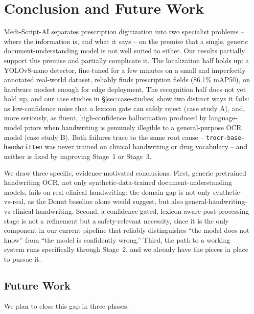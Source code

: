 \documentclass[conference]{IEEEtran}
\begin{document}
\section{Conclusion and Future Work}
\label{sec:conclusion}

Medi-Script-AI separates prescription digitization into two specialist problems -- where the information is, and what it says -- on the premise that a single, generic document-understanding model is not well suited to either. Our results partially support this premise and partially complicate it. The localization half holds up: a YOLOv8-nano detector, fine-tuned for a few minutes on a small and imperfectly annotated real-world dataset, reliably finds prescription fields (86.1\% mAP50), on hardware modest enough for edge deployment. The recognition half does not yet hold up, and our case studies in \S\ref{sec:case-studies} show two distinct ways it fails: as low-confidence noise that a lexicon gate can safely reject (case study A), and, more seriously, as fluent, high-confidence hallucination produced by language-model priors when handwriting is genuinely illegible to a general-purpose OCR model (case study B). Both failures trace to the same root cause -- \texttt{trocr-base-handwritten} was never trained on clinical handwriting or drug vocabulary -- and neither is fixed by improving Stage~1 or Stage~3.

We draw three specific, evidence-motivated conclusions. First, generic pretrained handwriting OCR, not only synthetic-data-trained document-understanding models, fails on real clinical handwriting: the domain gap is not only synthetic-vs-real, as the Donut baseline alone would suggest, but also general-handwriting-vs-clinical-handwriting. Second, a confidence-gated, lexicon-aware post-processing stage is not a refinement but a safety-relevant necessity, since it is the only component in our current pipeline that reliably distinguishes ``the model does not know'' from ``the model is confidently wrong.'' Third, the path to a working system runs specifically through Stage~2, and we already have the pieces in place to pursue it.

\subsection{Future Work}
\label{sec:future-work}

We plan to close this gap in three phases.
\end{document}
